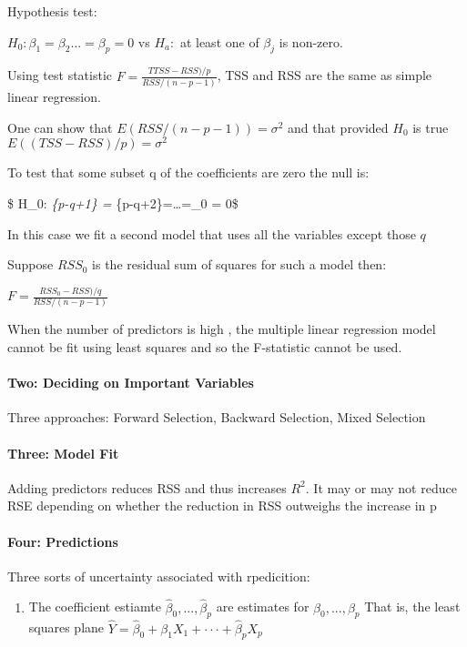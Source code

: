 \documentclass[
]{article}
\providecommand{\tightlist}{%
  \setlength{\itemsep}{0pt}\setlength{\parskip}{0pt}}
\begin{document}
Hypothesis test:

\(H_0: \beta_1=\beta_2...=\beta_p=0\) vs \(H_a:\) at least one of
\(\beta_j\) is non-zero.

Using test statistic \(F= \frac{TTSS-RSS)/p}{RSS/(n-p-1)}\), TSS and RSS
are the same as simple linear regression.

One can show that \(E(RSS/(n-p-1)) = \sigma^2\) and that provided
\(H_0\) is true \(E((TSS-RSS)/p) = \sigma^2\)

To test that some subset q of the coefficients are zero the null is:

\$ H\_0: \beta\emph{\{p-q+1\} = \beta}\{p-q+2\}=\ldots=\beta\_0 = 0\$

In this case we fit a second model that uses all the variables except
those \(q\)

Suppose \(RSS_0\) is the residual sum of squares for such a model then:

\(F = \frac{RSS_0 - RSS)/q}{RSS/(n-p-1)}\)

When the number of predictors is high , the multiple linear regression
model cannot be fit using least squares and so the F-statistic cannot be
used.

\hypertarget{two-deciding-on-important-variables}{%
\paragraph{Two: Deciding on Important
Variables}\label{two-deciding-on-important-variables}}

Three approaches: Forward Selection, Backward Selection, Mixed Selection

\hypertarget{three-model-fit}{%
\paragraph{Three: Model Fit}\label{three-model-fit}}

Adding predictors reduces RSS and thus increases \(R^2\). It may or may
not reduce RSE depending on whether the reduction in RSS outweighs the
increase in p

\hypertarget{four-predictions}{%
\paragraph{Four: Predictions}\label{four-predictions}}

Three sorts of uncertainty associated with rpedicition:

\begin{enumerate}
\def\labelenumi{\arabic{enumi}.}
\tightlist
\item
  The coefficient estiamte \(\hat\beta_0,...,\hat\beta_p\) are estimates
  for \(\beta_0,...,\beta_p\) That is, the least squares plane
  \(\hat Y = \hat\beta_0 +\beta_1 X_1 +\cdot\cdot\cdot+\hat\beta_p X_p\)
\end{enumerate}
\end{document}
